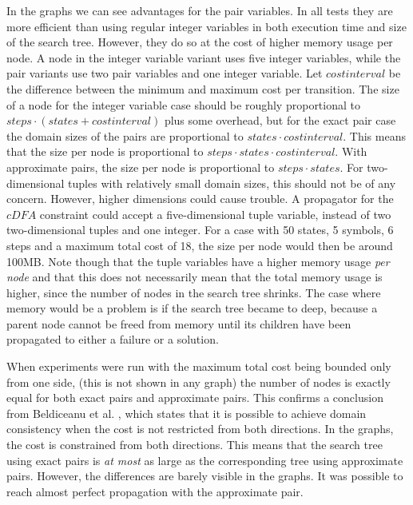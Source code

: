 \documentclass[a4paper,11pt]{article}
\begin{document}
In the graphs we can see advantages for the pair variables. In all tests they are more efficient than using regular integer variables in both execution time and size of the search tree. However, they do so at the cost of higher memory usage per node. A node in the integer variable variant uses five integer variables, while the pair variants use two pair variables and one integer variable. Let $\mathit{costinterval}$ be the difference between the minimum and maximum cost per transition. The size of a node for the integer variable case should be roughly proportional to $\mathit{steps}\cdot (\mathit{states} + \mathit{costinterval})$ plus some overhead, but for the exact pair case the domain sizes of the pairs are proportional to $\mathit{states} \cdot \mathit{costinterval}$. This means that the size per node is proportional to $\mathit{steps}\cdot \mathit{states}\cdot \mathit{costinterval}$. With approximate pairs, the size per node is proportional to $\mathit{steps}\cdot \mathit{states}$. For two-dimensional tuples with relatively small domain sizes, this should not be of any concern. However, higher dimensions could cause trouble. A propagator for the $\mathit{cDFA}$ constraint could accept a five-dimensional tuple variable, instead of two two-dimensional tuples and one integer. For a case with 50 states, 5 symbols, 6 steps and a maximum total cost of 18, the size per node would then be around 100MB. Note though that the tuple variables have a higher memory usage \textit{per node} and that this does not necessarily mean that the total memory usage is higher, since the number of nodes in the search tree shrinks. The case where memory would be a problem is if the search tree became to deep, because a parent node cannot be freed from memory until its children have been propagated to either a failure or a solution.

When experiments were run with the maximum total cost being bounded only from one side, (this is not shown in any graph) the number of nodes is exactly equal for both exact pairs and approximate pairs. This confirms a conclusion from Beldiceanu et al. \cite{Beldiceanu675954}, which states that it is possible to achieve domain consistency when the cost is not restricted from both directions. In the graphs, the cost is constrained from both directions. This means that the search tree using exact pairs is \textit{at most} as large as the corresponding tree using approximate pairs. However, the differences are barely visible in the graphs. It was possible to reach almost perfect propagation with the approximate pair.
\end{document}
